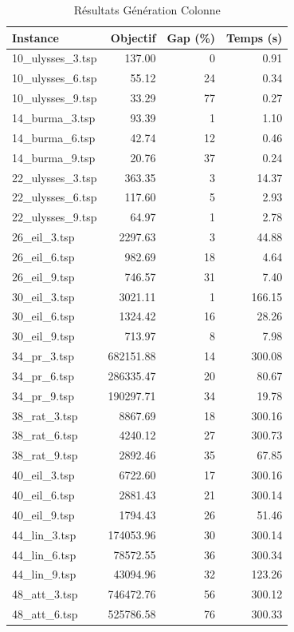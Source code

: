 \begin{table}[H]
\centering
\caption{Résultats Génération Colonne}
\small
\begin{tabular}{|l|r|r|r|}
\hline
\textbf{Instance} & \textbf{Objectif} & \textbf{Gap (\%)} & \textbf{Temps (s)} \\
\hline
10\_ulysses\_3.tsp & 137.00 & 0 & 0.91 \\
10\_ulysses\_6.tsp & 55.12 & 24 & 0.34 \\
10\_ulysses\_9.tsp & 33.29 & 77 & 0.27 \\
14\_burma\_3.tsp & 93.39 & 1 & 1.10 \\
14\_burma\_6.tsp & 42.74 & 12 & 0.46 \\
14\_burma\_9.tsp & 20.76 & 37 & 0.24 \\
22\_ulysses\_3.tsp & 363.35 & 3 & 14.37 \\
22\_ulysses\_6.tsp & 117.60 & 5 & 2.93 \\
22\_ulysses\_9.tsp & 64.97 & 1 & 2.78 \\
26\_eil\_3.tsp & 2297.63 & 3 & 44.88 \\
26\_eil\_6.tsp & 982.69 & 18 & 4.64 \\
26\_eil\_9.tsp & 746.57 & 31 & 7.40 \\
30\_eil\_3.tsp & 3021.11 & 1 & 166.15 \\
30\_eil\_6.tsp & 1324.42 & 16 & 28.26 \\
30\_eil\_9.tsp & 713.97 & 8 & 7.98 \\
34\_pr\_3.tsp & 682151.88 & 14 & 300.08 \\
34\_pr\_6.tsp & 286335.47 & 20 & 80.67 \\
34\_pr\_9.tsp & 190297.71 & 34 & 19.78 \\
38\_rat\_3.tsp & 8867.69 & 18 & 300.16 \\
38\_rat\_6.tsp & 4240.12 & 27 & 300.73 \\
38\_rat\_9.tsp & 2892.46 & 35 & 67.85 \\
40\_eil\_3.tsp & 6722.60 & 17 & 300.16 \\
40\_eil\_6.tsp & 2881.43 & 21 & 300.14 \\
40\_eil\_9.tsp & 1794.43 & 26 & 51.46 \\
44\_lin\_3.tsp & 174053.96 & 30 & 300.14 \\
44\_lin\_6.tsp & 78572.55 & 36 & 300.34 \\
44\_lin\_9.tsp & 43094.96 & 32 & 123.26 \\
48\_att\_3.tsp & 746472.76 & 56 & 300.12 \\
48\_att\_6.tsp & 525786.58 & 76 & 300.33 \\

\end{tabular}
\end{table}
